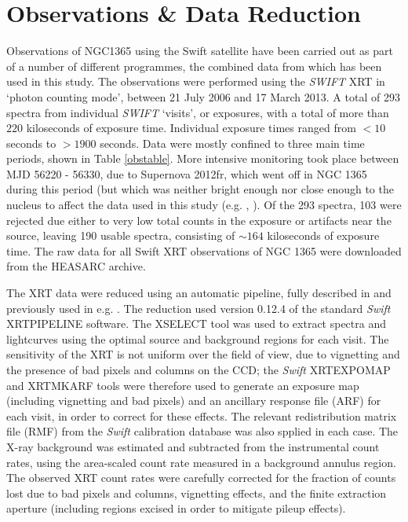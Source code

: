 \documentclass[useAMS,usenatbib]{sam}
\begin{document}
\section{Observations \& Data Reduction}

Observations of NGC1365 using the Swift satellite have been carried out as part of a number of different programmes, the combined data from which has been used in this
study. The observations were performed using the {\it SWIFT} XRT in `photon counting mode', between 21 July 2006 and 17 March 2013. A total of 293 spectra from individual
{\it SWIFT} `visits', or exposures, with a total of more than $220$ kiloseconds of exposure time. Individual exposure times ranged from $<10$ seconds to $>1900$ seconds.
Data were mostly confined to three main time periods, shown in Table \ref{obstable}. More intensive monitoring took place between MJD 56220 - 56330, due to Supernova
2012fr, which went off in NGC 1365 during this period (but which was neither bright enough nor close enough to the nucleus to affect
the data used in this study (e.g. \citet{klotz}, \citet{childress}). Of the 293 spectra, 103 were rejected due either to
very low total counts in the exposure or artifacts near the source, leaving 190 usable spectra, consisting of $\sim164$
kiloseconds of exposure time. The raw data for all Swift XRT observations of NGC 1365 were downloaded from the
HEASARC archive.

The XRT data were reduced using an automatic pipeline, fully described in \citet{fabian12} and previously used in e.g. \citet{cameron}. The reduction used version 0.12.4
of the standard {\it Swift} XRTPIPELINE software. The XSELECT tool was used to extract spectra and lightcurves using the optimal source and background regions for each
visit. The sensitivity of the XRT is not uniform over the field of view, due to vignetting and the presence of bad pixels and columns on the CCD; the {\it Swift}
XRTEXPOMAP and XRTMKARF tools were therefore used to generate an exposure map (including vignetting and bad pixels) and an ancillary response file (ARF) for each visit,
in order to correct for these effects. The relevant redistribution matrix file (RMF) from the {\it Swift} calibration database was also spplied in each case. The X-ray
background was estimated and subtracted from the instrumental count rates, using the area-scaled count rate measured in a background annulus region. The observed XRT
count rates were carefully corrected for the fraction of counts lost due to bad pixels and columns, vignetting effects, and the finite extraction aperture (including
regions excised in order to mitigate pileup effects).
\end{document}
